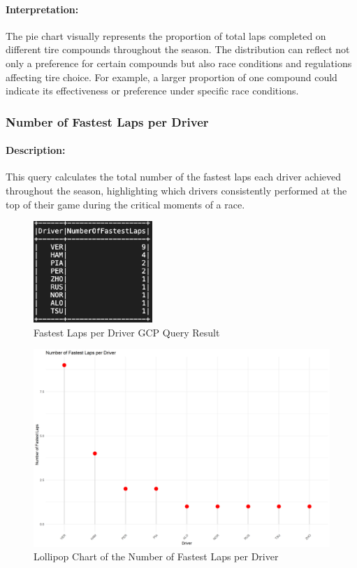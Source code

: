 \documentclass{article}
\begin{document}
\paragraph{Interpretation:}
The pie chart visually represents the proportion of total laps completed on different tire compounds throughout the season. The distribution can reflect not only a preference for certain compounds but also race conditions and regulations affecting tire choice. For example, a larger proportion of one compound could indicate its effectiveness or preference under specific race conditions.


\subsubsection{Number of Fastest Laps per Driver}
\paragraph{Description:}
This query calculates the total number of the fastest laps each driver achieved throughout the season, highlighting which drivers consistently performed at the top of their game during the critical moments of a race.

\begin{figure}[H]
    \centering
    \includegraphics[width=0.4\textwidth]{ss-fast-laps.png}
    \caption{Fastest Laps per Driver GCP Query Result}
\end{figure}

\begin{figure}[H]
    \centering
    \includegraphics[width=\textwidth]{fastest_laps_lollipop.png}
    \caption{Lollipop Chart of the Number of Fastest Laps per Driver}
\end{figure}
\end{document}
